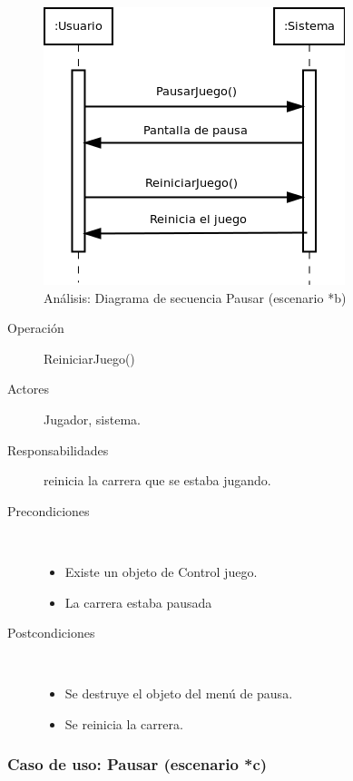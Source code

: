 \begin{figure}[H] 
  \label{secuencia_pausar2}
  \begin{center}
    \includegraphics[scale=0.7]{imagenes/analisis/secuencia_pausar2.png}
  \end{center}
  \caption{Análisis: Diagrama de secuencia Pausar (escenario *b)}
\end{figure}

\begin{description}
    \item [Operación] ReiniciarJuego()
    \item [Actores] Jugador, sistema.
    \item [Responsabilidades] reinicia la carrera que se estaba jugando.
    \item [Precondiciones] $\quad$
        \begin{itemize}
            \item Existe un objeto de Control juego.
            \item La carrera estaba pausada
        \end{itemize}
    \item [Postcondiciones] $\quad$
        \begin{itemize}
            \item Se destruye el objeto del menú de pausa.
            \item Se reinicia la carrera.
        \end{itemize}
\end{description}

\subsubsection{Caso de uso: Pausar (escenario *c)}

